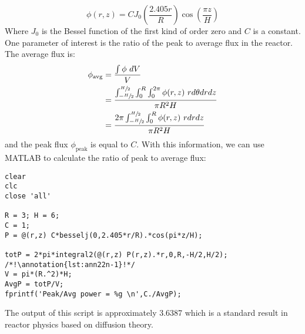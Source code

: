 \begin{equation*}
\phi(r,z) = C J_0\left(\frac{2.405r}{R} \right)\cos{\left(\frac{\pi z}{H} \right)}
\end{equation*} 
Where $J_{0}$ is the Bessel function of the first kind of order zero and $C$ is a constant. One parameter of interest is the ratio of the peak to average flux in the reactor.  The average flux is:
\begin{align*}
\phi_{\text{avg}} &= \frac{\int \phi \ dV}{V} \\
&= \frac{\int_{-\sfrac{H}{2}}^{\sfrac{H}{2}} \int_{0}^{R}  \int_{0}^{2 \pi} \phi(r,z) \ r d\theta drdz }{\pi R^2 H} \\
&= \frac{2 \pi  \int_{-\sfrac{H}{2}}^{\sfrac{H}{2}} \int_{0}^{R} \phi(r,z) \ rdrdz }{\pi R^2 H}
\end{align*}
and the peak flux $\phi_{\text{peak}}$ is equal to $C$.  With this information, we can use MATLAB to calculate the ratio of peak to average flux:
\begin{lstlisting}[style=myMatlab,name=lec22n-ex4]
clear
clc
close 'all'

R = 3; H = 6;
C = 1;
P = @(r,z) C*besselj(0,2.405*r/R).*cos(pi*z/H);

totP = 2*pi*integral2(@(r,z) P(r,z).*r,0,R,-H/2,H/2); /*!\annotation{lst:ann22n-1}!*/
V = pi*(R.^2)*H;
AvgP = totP/V;
fprintf('Peak/Avg power = %g \n',C./AvgP);
\end{lstlisting}
The output of this script is approximately 3.6387 which is a standard result in reactor physics based on diffusion theory.


